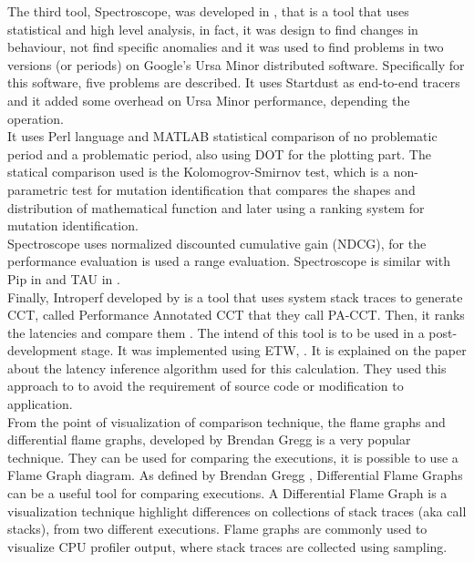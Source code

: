 The third tool, Spectroscope, was developed in \cite{Sambasivan2011DPC19724571972463}, that is a tool that uses statistical and high level analysis, in fact, it was design to find changes in behaviour, not find specific anomalies and it was used to find problems in two versions (or periods) on Google's Ursa Minor distributed software. Specifically for this software, five problems are described. It uses Startdust as end-to-end tracers and it added some overhead on Ursa Minor performance, depending the operation. \\
It uses Perl language and MATLAB statistical comparison of no problematic period and a problematic period, also using DOT for the plotting part.
The statical comparison used is the Kolomogrov-Smirnov test,  which is a non-parametric test for mutation identification that compares the shapes and distribution of mathematical function and later using a ranking system for mutation identification.\\
 Spectroscope uses normalized discounted cumulative gain (NDCG), for the performance evaluation is used a range evaluation. Spectroscope is similar with Pip in \cite{Pip} and TAU in \cite{TAU}.\\
Finally, Introperf developed by \cite{Introperf} is a tool that uses system stack traces to generate CCT, called Performance Annotated CCT that they call PA-CCT. Then, it ranks the latencies and compare them \cite{Introperf}. The intend of this tool is to be used in a post-development stage. It was implemented using ETW, \cite{ETW}. It is explained on the paper about the latency inference algorithm used for this calculation. They used this approach to to avoid the requirement of source code or modification to application. \\

From the point of visualization of comparison technique, the flame graphs and differential flame graphs, developed by Brendan Gregg is a very popular technique. They can be used for comparing the executions, it is possible to use a Flame Graph diagram. As defined by Brendan Gregg \cite{differential_flame}, Differential Flame Graphs can be a useful tool for comparing executions. A Differential Flame Graph is a visualization technique highlight differences on collections of stack traces (aka call stacks), from two different executions. Flame graphs are commonly used to visualize CPU profiler output, where stack traces are collected using sampling.